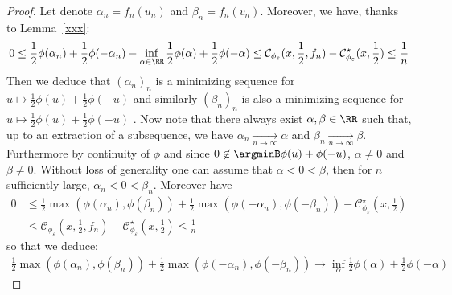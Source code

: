 \begin{proof}
Let denote $\alpha_n = f_n(u_n)$ and $\beta_n = f_n(v_n)$. %
Moreover, we have, thanks to Lemma~\ref{xxx}:
\begin{align*}
  0\leq \frac12 \phi(\alpha_n) +  \frac12 \phi(-\alpha_n)- \inf_{\alpha\in\RR}\frac12 \phi(\alpha)+\frac12\phi(-\alpha)\leq \mathcal{C}_{\phi_\varepsilon}(x,\frac12,f_n) - \mathcal{C}_{\phi_\varepsilon}^\star(x,\frac12)\leq \frac1n
\end{align*}
Then we deduce that $(\alpha_n)_n$ is a minimizing sequence for  $u\mapsto\frac12\phi(u)+\frac12\phi(-u)$ and similarly $(\beta_n)_n$ is also a minimizing sequence for  $u\mapsto\frac12\phi(u)+\frac12\phi(-u)$ . Now note that there always exist $\alpha, \beta\in \bar{\RR}$ such that, up to an extraction of a subsequence, we have $\alpha_n\xrightarrow[n\to\infty]{} \alpha$ and $\beta_n \xrightarrow[n\to\infty]{} \beta$. Furthermore by continuity of $\phi$ and since $0\not\in\argminB\phi(u)+\phi(-u)$, $\alpha\neq0$ and $\beta\neq 0$. Without loss of generality one can assume that $\alpha<0<\beta$, then for $n$ sufficiently large, $\alpha_n<0<\beta_n$. Moreover have 
\begin{align*}
     0&\leq\frac12\max\left(\phi(\alpha_n),\phi(\beta_n)\right)+\frac12\max\left(\phi(-\alpha_n),\phi(-\beta_n)\right)- \mathcal{C}^\star_{\phi_\varepsilon}(x,\frac12)\\
     &\leq \mathcal{C}_{\phi_\varepsilon}(x,\frac12,f_n) - \mathcal{C}_{\phi_\varepsilon}^\star(x,\frac12)\leq \frac1n
\end{align*}
so that we deduce:
\begin{align}
\label{eq:limitalphabeta}
 \frac12\max\left(\phi(\alpha_n),\phi(\beta_n)\right)+\frac12\max\left(\phi(-\alpha_n),\phi(-\beta_n)\right)\longrightarrow \inf_\alpha \frac12\phi(\alpha)+\frac12\phi(-\alpha) 
\end{align}


\end{proof}
